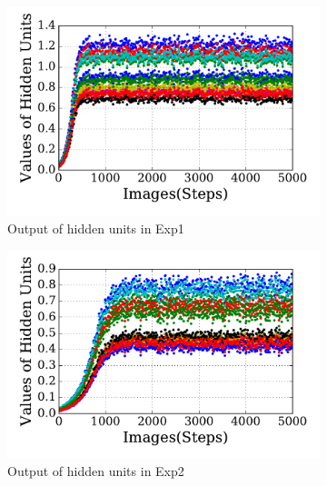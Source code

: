 \begin{figure}
\DIFdelendFL \DIFaddbeginFL \begin{subfigure}[t]{0.48\textwidth}
		\DIFaddendFL \includegraphics[width=\textwidth]{pics_sdlm/21_exp_AE_noise/exp1_hid_s.pdf}
		\caption{Output of hidden units in Exp1}
	\end{subfigure}
	\DIFdelbeginFL %
\DIFdelendFL \DIFaddbeginFL \begin{subfigure}[t]{0.48\textwidth}
		\DIFaddendFL \includegraphics[width=\textwidth]{pics_sdlm/21_exp_AE_noise/exp2_hid_s.pdf}
		\caption{Output of hidden units in Exp2}
	\end{subfigure}\\
	\DIFdelbeginFL %
\DIFdelendFL \DIFaddbeginFL \begin{subfigure}[t]{0.48\textwidth}

\end{subfigure}
\end{figure}
